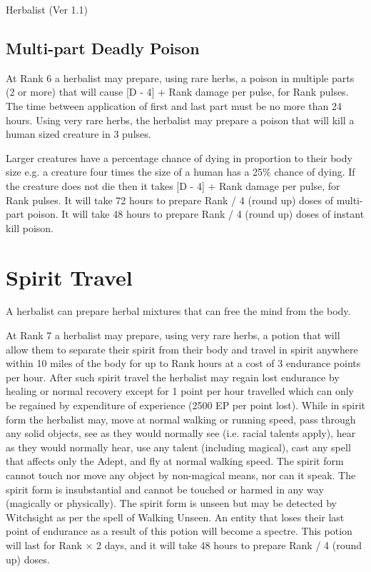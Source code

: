 \begin{Chapter}{Herbalist (Ver 1.1)}
\subsection{Multi-part Deadly Poison}

At Rank 6 a herbalist may prepare, using rare herbs, a poison in
multiple parts (2 or more) that will cause [D - 4] + Rank damage per
pulse, for Rank pulses. The time between application of first and last
part must be no more than 24 hours. Using very rare herbs, the
herbalist may prepare a poison that will kill a human sized creature
in 3 pulses.

Larger creatures have a percentage chance of dying in proportion to
their body size e.g. a creature four times the size of a human has a
25\% chance of dying. If the creature does not die then it takes [D -
  4] + Rank damage per pulse, for Rank pulses.  It will take 72 hours
to prepare Rank / 4 (round up) doses of multi-part poison. It will
take 48 hours to prepare Rank / 4 (round up) doses of instant kill
poison.

\section{Spirit Travel}

A herbalist can prepare herbal mixtures that can free the mind from
the body.

At Rank 7 a herbalist may prepare, using very rare herbs, a potion
that will allow them to separate their spirit from their body and
travel in spirit anywhere within 10 miles of the body for up to Rank
hours at a cost of 3 endurance points per hour.  After such spirit
travel the herbalist may regain lost endurance by healing or normal
recovery except for 1 point per hour travelled which can only be
regained by expenditure of experience (2500 EP per point lost).  While
in spirit form the herbalist may, move at normal walking or running
speed, pass through any solid objects, see as they would normally see
(i.e. racial talents apply), hear as they would normally hear, use
any talent (including magical), cast any spell that affects only the
Adept, and fly at normal walking speed.  The spirit form cannot touch
nor move any object by non-magical means, nor can it speak.  The
spirit form is insubstantial and cannot be touched or harmed in any
way (magically or physically).  The spirit form is unseen but may be
detected by Witchsight as per the spell of Walking Unseen. An entity
that loses their last point of endurance as a result of this potion
will become a spectre.  This potion will last for Rank × 2 days, and
it will take 48 hours to prepare Rank / 4 (round up) doses.

\end{Chapter}
